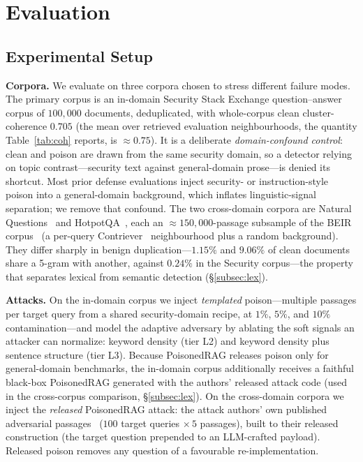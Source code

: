 \documentclass[10pt,journal,compsoc]{IEEEtran}
\begin{document}
\section{Evaluation}
\label{sec:eval}
\subsection{Experimental Setup}

\noindent\textbf{Corpora.} We evaluate on three corpora chosen to stress
different failure modes. The primary corpus is an in-domain Security Stack
Exchange question--answer corpus of $100{,}000$ documents, deduplicated, with
whole-corpus clean cluster-coherence $0.705$ (the mean over retrieved evaluation
neighbourhoods, the quantity Table~\ref{tab:coh} reports, is $\approx\!0.75$).
It is a deliberate \emph{domain-confound control}: clean and poison are drawn from
the same security domain, so a detector relying on topic contrast---security text
against general-domain prose---is denied its shortcut. Most prior defense
evaluations inject security- or instruction-style poison into a general-domain
background, which inflates linguistic-signal separation; we remove that confound.
The two cross-domain corpora are Natural Questions~\cite{nq} and
HotpotQA~\cite{hotpotqa}, each an $\approx\!150{,}000$-passage subsample of the
BEIR corpus~\cite{beir} (a per-query Contriever~\cite{contriever} neighbourhood plus
a random background). They differ sharply in benign duplication---$1.15\%$ and $9.06\%$ of
clean documents share a 5-gram with another, against $0.24\%$ in the Security
corpus---the property that separates lexical from semantic detection
(\S\ref{subsec:lex}).

\noindent\textbf{Attacks.} On the in-domain corpus we inject \emph{templated}
poison---multiple passages per target query from a shared security-domain recipe,
at $1\%$, $5\%$, and $10\%$ contamination---and model the adaptive adversary by
ablating the soft signals an attacker can normalize: keyword density (tier L2) and
keyword density plus sentence structure (tier L3). Because PoisonedRAG releases
poison only for general-domain benchmarks, the in-domain corpus additionally
receives a faithful black-box PoisonedRAG generated with the authors' released
attack code (used in the cross-corpus comparison, \S\ref{subsec:lex}). On the
cross-domain corpora we inject the \emph{released} PoisonedRAG attack: the attack
authors' own published
adversarial passages~\cite{poisonedrag} ($100$ target queries $\times\,5$
passages), built to their released construction (the target question prepended to
an LLM-crafted payload). Released poison removes any question of a favourable
re-implementation.
\end{document}

